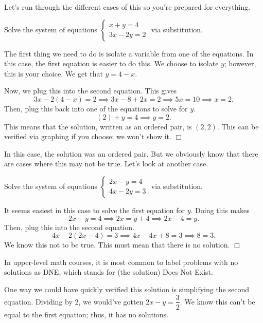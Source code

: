 \documentclass[lang=en,11pt]{elegantbook}
\begin{document}
Let's run through the different cases of this so you're prepared for everything.
\begin{example}
Solve the system of equations $\begin{cases} x+y=4 \\ 3x-2y=2 \end{cases}$ via substitution.
\end{example}
\begin{solution}
\noindent The first thing we need to do is isolate a variable from one of the equations.  In this case, the first equation is easier to do this.  We choose to isolate $y$; however, this is your choice.  We get that $y=4-x$.

Now, we plug this into the second equation.  This gives $$3x-2(4-x)=2 \implies 3x-8+2x=2 \implies 5x=10 \implies x=2.$$  Then, plug this back into one of the equations to solve for $y$.  
$$(2)+y=4 \implies y=2.$$  This means that the solution, written as an ordered pair, is $(2,2)$.  This can be verified via graphing if you choose; we won't show it.  $\Box$
\end{solution}
In this case, the solution was an ordered pair.  But we obviously know that there are cases where this may not be true.  Let's look at another case.
\begin{example}
Solve the system of equations $\begin{cases} 2x-y=4 \\ 4x-2y=3 \end{cases}$ via substitution.
\end{example}
\begin{solution}
It seems easiest in this case to solve the first equation for $y$.  Doing this makes $$2x-y=4 \implies 2x=y+4 \implies 2x-4=y.$$  Then, plug this into the second equation.  $$4x-2(2x-4)=3 \implies 4x-4x+8=3 \implies 8=3.$$  We know this not to be true.  This must mean that there is no solution.  $\Box$
\end{solution}

\begin{remark}
  In upper-level math courses, it is most common to label problems with no solutions as DNE, which stands for (the solution) Does Not Exist.
\end{remark}

One way we could have quickly verified this solution is simplifying the second equation.  Dividing by $2$, we would've gotten $2x-y=\dfrac{3}{2}$.  We know this can't be equal to the first equation; thus, it has no solutions.
\end{document}
